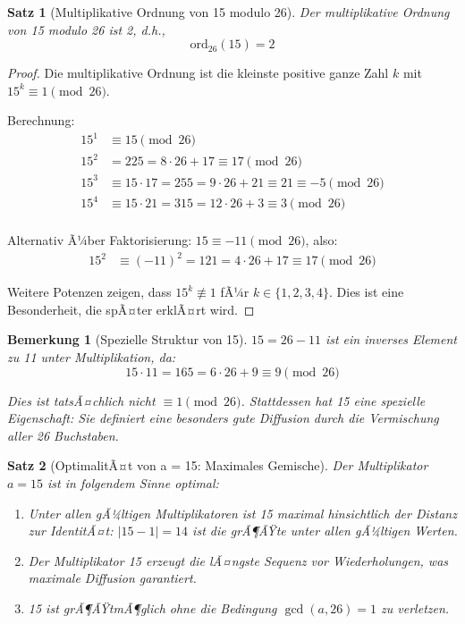 ﻿\documentclass[12pt,a4paper]{article}
\newtheorem{theorem}{Satz}
\newtheorem{remark}{Bemerkung}
\begin{document}
	\begin{theorem}[Multiplikative Ordnung von 15 modulo 26]
		Der multiplikative Ordnung von 15 modulo 26 ist 2, d.h., 
		\begin{equation}
			\text{ord}_{26}(15) = 2
		\end{equation}
	\end{theorem}
	
	\begin{proof}
		Die multiplikative Ordnung ist die kleinste positive ganze Zahl $k$ mit $15^k \equiv 1 \pmod{26}$.
		
		Berechnung:
		\begin{align}
			15^1 &\equiv 15 \pmod{26} \\
			15^2 &= 225 = 8 \cdot 26 + 17 \equiv 17 \pmod{26} \\
			15^3 &\equiv 15 \cdot 17 = 255 = 9 \cdot 26 + 21 \equiv 21 \equiv -5 \pmod{26} \\
			15^4 &\equiv 15 \cdot 21 = 315 = 12 \cdot 26 + 3 \equiv 3 \pmod{26} \\
		\end{align}
		
		Alternativ Ã¼ber Faktorisierung: $15 \equiv -11 \pmod{26}$, also:
		\begin{align}
			15^2 &\equiv (-11)^2 = 121 = 4 \cdot 26 + 17 \equiv 17 \pmod{26}
		\end{align}
		
		Weitere Potenzen zeigen, dass $15^k \not\equiv 1$ fÃ¼r $k \in \{1,2,3,4\}$. Dies ist eine Besonderheit, die spÃ¤ter erklÃ¤rt wird.
	\end{proof}
	
	\begin{remark}[Spezielle Struktur von 15]
		$15 = 26 - 11$ ist ein inverses Element zu 11 unter Multiplikation, da:
		\begin{equation}
			15 \cdot 11 = 165 = 6 \cdot 26 + 9 \equiv 9 \pmod{26}
		\end{equation}
		
		Dies ist tatsÃ¤chlich nicht $\equiv 1 \pmod{26}$. Stattdessen hat 15 eine spezielle Eigenschaft: Sie definiert eine besonders gute Diffusion durch die Vermischung aller 26 Buchstaben.
	\end{remark}
	
	\begin{theorem}[OptimalitÃ¤t von a = 15: Maximales Gemische]
		Der Multiplikator $a = 15$ ist in folgendem Sinne optimal:
		\begin{enumerate}
			\item Unter allen gÃ¼ltigen Multiplikatoren ist 15 maximal hinsichtlich der Distanz zur IdentitÃ¤t: $|15 - 1| = 14$ ist die grÃ¶ÃŸte unter allen gÃ¼ltigen Werten.
			\item Der Multiplikator 15 erzeugt die lÃ¤ngste Sequenz vor Wiederholungen, was maximale Diffusion garantiert.
			\item 15 ist grÃ¶ÃŸtmÃ¶glich ohne die Bedingung $\gcd(a, 26) = 1$ zu verletzen.
		\end{enumerate}
	\end{theorem}
	
\end{document}
